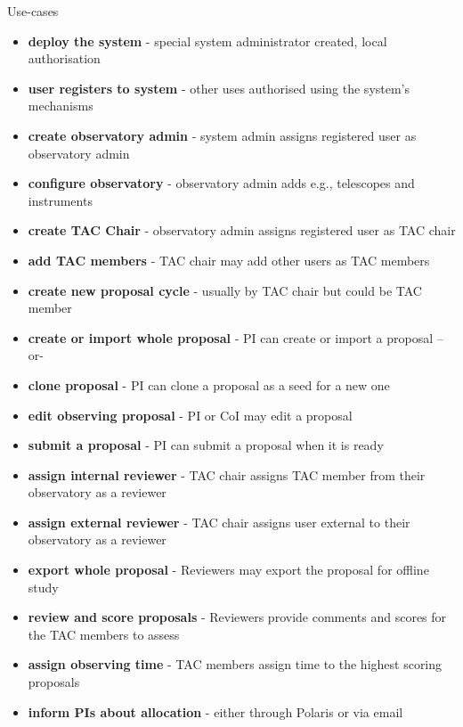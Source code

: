 \documentclass[final]{beamer}
\newlength{\colwidth}
\begin{document}
\begin{frame}[t]
\begin{columns}[t]
\begin{column}{\colwidth}
\begin{block}{Use-cases}
                    \begin{itemize}
                        \item \textbf{deploy the system} - special system administrator created, local authorisation
                        \item \textbf{user registers to system} - other uses authorised using the system's mechanisms
                        \item \textbf{create observatory admin} - system admin assigns registered user as observatory admin
                        \item \textbf{configure observatory} - observatory admin adds e.g., telescopes and instruments
                        \item \textbf{create TAC Chair} - observatory admin assigns registered user as TAC chair
                        \item \textbf{add TAC members} - TAC chair may add other users as TAC members
                        \item \textbf{create new proposal cycle} - usually by TAC chair but could be TAC member
                        \item \textbf{create or import whole proposal} - PI can create or import a proposal --or-
                        \item \textbf{clone proposal} - PI can clone a proposal as a seed for a new one
                        \item \textbf{edit observing proposal} - PI or CoI may edit a proposal
                        \item \textbf{submit a proposal} - PI can submit a proposal when it is ready
                        \item \textbf{assign internal reviewer} - TAC chair assigns TAC member from their observatory as a reviewer
                        \item \textbf{assign external reviewer} - TAC chair assigns user external to their observatory as a reviewer
                        \item \textbf{export whole proposal} - Reviewers may export the proposal for offline study
                        \item \textbf{review and score proposals} - Reviewers provide comments and scores for the TAC members to assess
                        \item \textbf{assign observing time} - TAC members assign time to the highest scoring proposals
                        \item \textbf{inform PIs about allocation} - either through Polaris or via email
                    \end{itemize}


\end{block}
\end{column}
\end{columns}
\end{frame}
\end{document}
